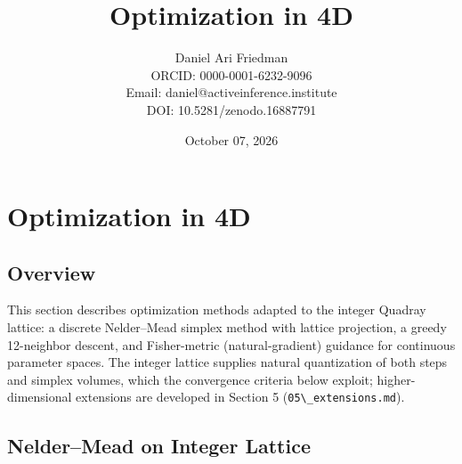 \documentclass[
  10pt,
]{article}
\title{Optimization in 4D}
\author{Daniel Ari Friedman\\ ORCID: 0000-0001-6232-9096\\ Email: daniel@activeinference.institute\\ DOI: 10.5281/zenodo.16887791}
\date{October 07, 2026}
\newcommand{\passthrough}[1]{#1}
\begin{document}
\maketitle

{
\hypersetup{linkcolor=black}
\setcounter{tocdepth}{3}
\tableofcontents
}
\section{Optimization in 4D}\label{optimization-in-4d}

\subsection{Overview}\label{overview}

This section describes optimization methods adapted to the integer
Quadray lattice: a discrete Nelder--Mead simplex method with lattice
projection, a greedy 12-neighbor descent, and Fisher-metric
(natural-gradient) guidance for continuous parameter spaces. The integer
lattice supplies natural quantization of both steps and simplex volumes,
which the convergence criteria below exploit; higher-dimensional
extensions are developed in Section 5
(\passthrough{\lstinline!05\_extensions.md!}).

\subsection{Nelder--Mead on Integer
Lattice}\label{neldermead-on-integer-lattice}
\end{document}
